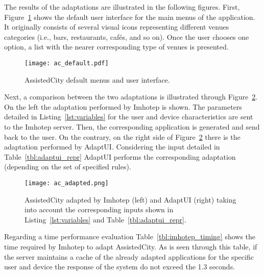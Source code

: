 The results of the adaptations are illustrated in the following figures. First,
Figure~\ref{fig:ac_default} shows the default user interface for the main menus 
of the application. It originally consists of several visual icons representing 
different venues categories (i.e., bars, restaurants, cafés, and so on). Once the 
user chooses one option, a list with the nearer corresponding type of venues
is presented.

\begin{figure}[H]
\centering
\texttt{[image: ac\_default.pdf]}
\caption{AssistedCity default menus and user interface.}
\label{fig:ac_default}
\end{figure}

Next, a comparison between the two adaptations is illustrated through 
Figure~\ref{fig:ac_adapted}. On the left the adaptation performed by Imhotep is 
shown. The parameters detailed in Listing~\ref{lst:variables} for the user and 
device characteristics are sent to the Imhotep server. Then, the corresponding
application is generated and send back to the user. On the contrary, on the 
right side of Figure~\ref{fig:ac_adapted} there is the adaptation performed by 
AdaptUI. Considering the input detailed in Table~\ref{tbl:adaptui_repr} AdaptUI 
performs the corresponding adaptation (depending on the set of specified rules).

\begin{figure}[H]
\centering
\texttt{[image: ac\_adapted.png]}
\caption{AssistedCity adapted by Imhotep (left) and AdaptUI (right) taking 
into account the corresponding inputs shown in Listing~\ref{lst:variables} and 
Table~\ref{tbl:adaptui_repr}.}
\label{fig:ac_adapted}
\end{figure}



Regarding a time performance evaluation Table~\ref{tbl:imhotep_timing} shows
the time required by Imhotep to adapt AssistedCity. As is seen through this 
table, if the server maintains a cache of the already adapted applications for 
the specific user and device the response of the system do not exceed the 1.3
seconds. 

